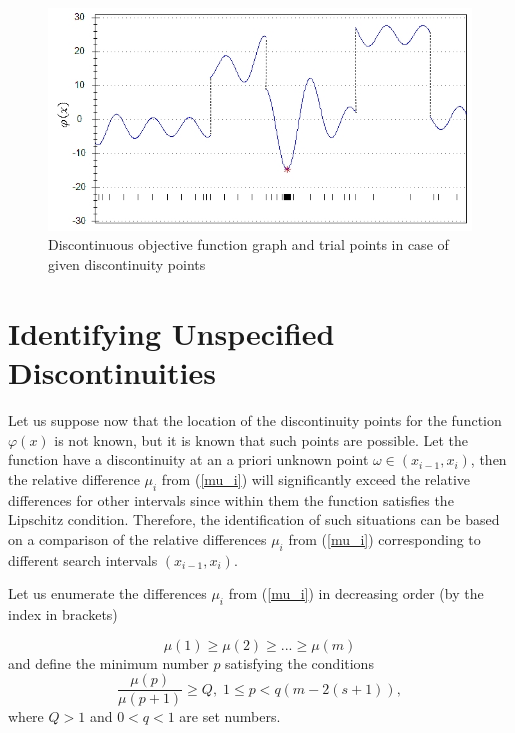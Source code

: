 \documentclass[runningheads]{llncs}
\begin{document}
\begin{figure}[!ht]
	\begin{center}
			\includegraphics[width=0.9\linewidth]{ris_1.jpg}
			\caption{Discontinuous objective function graph and trial points in case of given discontinuity points}
      \label{ris1}
	\end{center}
\end{figure}

\section{Identifying Unspecified Discontinuities}

Let us suppose now that the location of the discontinuity points for the function $\varphi(x)$ is not known, but it is known that such points are possible. Let the function have a discontinuity at an a priori unknown point $\omega \in(x_{i-1},x_i)$, then the relative difference $\mu_i$ from (\ref{mu_i}) will significantly exceed the relative differences for other intervals since within them the function satisfies the Lipschitz condition. Therefore, the identification of such situations can be based on a comparison of the relative differences $\mu_i$ from (\ref{mu_i}) corresponding to different search intervals $(x_{i-1},x_i)$.

Let us enumerate the differences $\mu_i$ from (\ref{mu_i}) in decreasing order (by the index in brackets)

\begin{equation}\label{mu_cond}
\mu(1) \geq \mu(2) \geq ... \geq \mu(m)
\end{equation}
and define the minimum number $p$ satisfying the conditions
\begin{equation}\label{mu_main_cond}
 \frac{\mu(p)}{\mu(p+1)} \geq Q, \; 1 \leq p < q(m-2(s+1)),
\end{equation}
where $Q>1$ and $0<q<1$ are set numbers.
\end{document}
